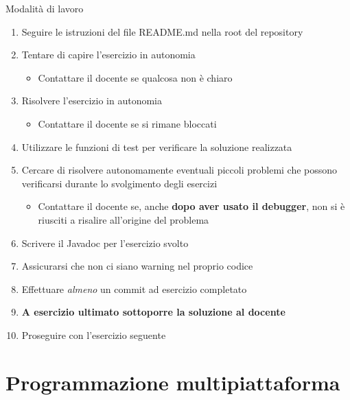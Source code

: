 \documentclass[presentation]{beamer}
\begin{document}
\begin{frame}{Modalità di lavoro}
	\begin{enumerate}
		\item Seguire le istruzioni del file README.md nella root del repository
		\item Tentare di capire l'esercizio in autonomia
		\begin{itemize}
			\item Contattare il docente se qualcosa non è chiaro
		\end{itemize}
		\item Risolvere l'esercizio in autonomia
		\begin{itemize}
			\item Contattare il docente se si rimane bloccati
		\end{itemize}
		\item Utilizzare le funzioni di test per verificare la soluzione realizzata
		\item Cercare di risolvere autonomamente eventuali piccoli problemi che possono verificarsi durante lo svolgimento degli esercizi
		\begin{itemize}
			\item Contattare il docente se, anche \textbf{dopo aver usato il debugger}, non si è riusciti a risalire all'origine del problema
		\end{itemize}
		\item Scrivere il Javadoc per l'esercizio svolto
		\item \alert{Assicurarsi che non ci siano warning nel proprio codice}
		\item Effettuare \textit{almeno} un commit ad esercizio completato
		\item \textbf{A esercizio ultimato sottoporre la soluzione al docente}
		\item Proseguire con l'esercizio seguente
	\end{enumerate}
\end{frame}

\section{Programmazione multipiattaforma}
\end{document}
